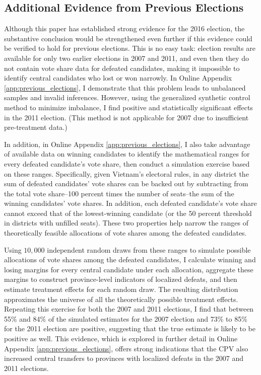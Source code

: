 \documentclass[12pt]{article}
\newcommand{\1}{\mathbbm{1}}
\begin{document}
\subsection*{Additional Evidence from Previous Elections}
\label{sec:previous_election}

Although this paper has established strong evidence for the 2016 election, the substantive conclusion would be strengthened even further if this evidence could be verified to hold for previous elections. This is no easy task: election results are available for only two earlier elections in 2007 and 2011, and even then they do not contain vote share data for defeated candidates, making it impossible to identify central candidates who lost or won narrowly. In Online Appendix \ref{app:previous_elections}, I demonstrate that this problem leads to unbalanced samples and invalid inferences. However, using the generalized synthetic control method to minimize imbalance, I find positive and statistically significant effects in the 2011 election. (This method is not applicable for 2007 due to insufficient pre-treatment data.) 

In addition, in Online Appendix \ref{app:previous_elections}, I also take advantage of available data on winning candidates to identify the mathematical ranges for every defeated candidate's vote share, then conduct a simulation exercise based on these ranges. Specifically, given Vietnam's electoral rules, in any district the sum of defeated candidates' vote shares can be backed out by subtracting from the total vote share--100 percent times the number of seats--the sum of the winning candidates' vote shares. In addition, each defeated candidate's vote share cannot exceed that of the lowest-winning candidate (or the 50 percent threshold in districts with unfilled seats). These two properties help narrow the ranges of theoretically feasible allocations of vote shares among the defeated candidates.

Using $10,000$ independent random draws from these ranges to simulate possible allocations of vote shares among the defeated candidates, I calculate winning and losing margins for every central candidate under each allocation, aggregate these margins to construct province-level indicators of localized defeats, and then estimate treatment effects for each random draw. The resulting distribution approximates the universe of all the theoretically possible treatment effects. Repeating this exercise for both the 2007 and 2011 elections, I find that between 55\% and 84\% of the simulated estimates for the 2007 election and 73\% to 85\% for the 2011 election are positive, suggesting that the true estimate is likely to be positive as well. This evidence, which is explored in further detail in Online Appendix \ref{app:previous_elections}, offers strong indications that the CPV also increased central transfers to provinces with localized defeats in the 2007 and 2011 elections.
\end{document}
